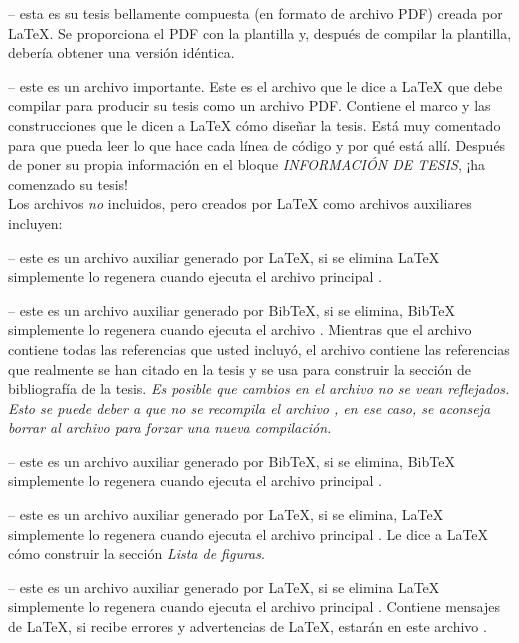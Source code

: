  -- esta es su tesis bellamente compuesta (en formato de archivo PDF) creada por \LaTeX {}. Se proporciona  el PDF con la plantilla y, después de compilar la plantilla, debería obtener una versión idéntica.

 -- este es un archivo importante. Este es el archivo que le dice a \LaTeX{} que debe compilar para producir su tesis como un archivo PDF. Contiene el marco y las construcciones que le dicen a \LaTeX{} cómo diseñar la tesis. Está muy comentado para que pueda leer lo que hace cada línea de código y por qué está allí. Después de poner su propia información en el bloque \emph{INFORMACIÓN DE TESIS}, ¡ha comenzado su tesis!
\\

Los archivos \emph{no} incluidos, pero creados por \LaTeX{} como archivos auxiliares incluyen:

 -- este es un archivo auxiliar generado por \LaTeX{}, si se elimina \LaTeX{} simplemente lo regenera cuando ejecuta el archivo principal .

 -- este es un archivo auxiliar generado por BibTeX, si se elimina, BibTeX simplemente lo regenera cuando ejecuta el archivo . Mientras que el archivo  contiene todas las referencias que usted incluyó, el archivo  contiene las referencias que realmente se han citado en la tesis y se usa para construir la sección de bibliografía de la tesis. \emph{Es posible que cambios en el archivo  no se vean reflejados. Esto se puede deber a que no se recompila el archivo , en ese caso, se aconseja borrar al archivo  para forzar una nueva compilación.}

 -- este es un archivo auxiliar generado por BibTeX, si se elimina, BibTeX simplemente lo regenera cuando ejecuta el archivo principal .

 -- este es un archivo auxiliar generado por \LaTeX{}, si se elimina, \LaTeX{} simplemente lo regenera cuando ejecuta el archivo principal . Le dice a \LaTeX{} cómo construir la sección \emph{Lista de figuras}.

 -- este es un archivo auxiliar generado por \LaTeX{}, si se elimina \LaTeX{} simplemente lo regenera cuando ejecuta el archivo principal . Contiene mensajes de \LaTeX{}, si recibe errores y advertencias de \LaTeX {}, estarán en este archivo .

